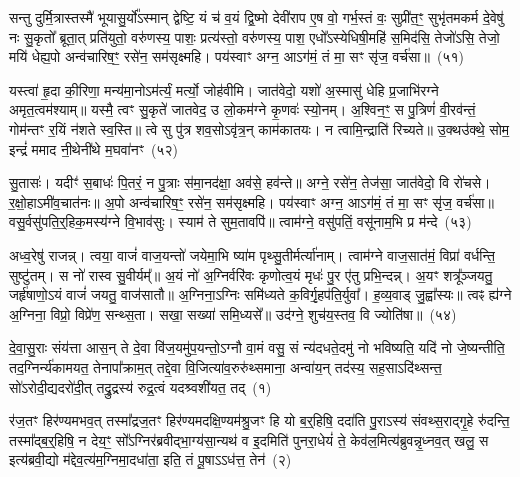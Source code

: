 सन्तु दुर्मि॒त्रास्तस्मै॑ भूयासु॒र्यो᳚\-ऽस्मान् द्वेष्टि॒ यं च॑ व॒यं द्वि॒ष्मो देवी॑राप ए॒ष वो॒ गर्भ॒स्तं वः॒ सुप्री॑त॒ꣳ॒ सुभृ॑तमकर्म दे॒वेषु॑ नः सु॒कृतो᳚ ब्रूता॒त् प्रति॑युतो॒ वरु॑णस्य॒ पाशः॒ प्रत्य॑स्तो॒ वरु॑णस्य॒ पाश॒ एधो᳚\-ऽस्येधिषी॒महि॑ स॒मिद॑सि॒ तेजो॑\-ऽसि॒ तेजो॒ मयि॑ धेह्य॒पो अन्व॑चारिष॒ꣳ॒ रसे॑न॒ सम॑सृक्ष्महि। पय॑स्वाꣳ अग्न॒ आ\-ऽग॑मं॒ तं मा॒ सꣳ सृ॑ज॒ वर्च॑सा॥~(५१)

{\anuvakamend[{दमे॑दम॒ ओष॑धय॒ आ षट् च॑}]}%

यस्त्वा॑ हृ॒दा की॒रिणा॒ मन्य॑मा॒नो\-ऽम॑र्त्यं॒ मर्त्यो॒ जोह॑वीमि। जात॑वेदो॒ यशो॑ अ॒स्मासु॑ धेहि प्र॒जाभि॑रग्ने अमृत॒त्वम॑श्याम्॥ यस्मै॒ त्वꣳ सु॒कृते॑ जातवेद॒ उ लो॒कम॑ग्ने कृ॒णवः॑ स्यो॒नम्। अ॒श्विन॒ꣳ॒ स पु॒त्रिणं॑ वी॒रव॑न्तं॒ गोम॑न्तꣳ र॒यिं न॑शते स्व॒स्ति॥ त्वे सु पु॑त्र शव॒सो\-ऽवृ॑त्र॒न् काम॑कातयः। न त्वामि॒न्द्राति॑ रिच्यते॥ उ॒क्थउ॑क्थे॒ सोम॒ इन्द्रं॑ ममाद नी॒थेनी॑थे म॒घवा॑नꣳ~(५२)

सु॒तासः॑। यदीꣳ॑ स॒बाधः॑ पि॒तरं॒ न पु॒त्राः स॑मा॒नद॑क्षा॒ अव॑से॒ हव॑न्ते॥ अग्ने॒ रसे॑न॒ तेज॑सा॒ जात॑वेदो॒ वि रो॑चसे। र॒क्षो॒हा\-ऽमी॑व॒चात॑नः॥ अ॒पो अन्व॑चारिष॒ꣳ॒ रसे॑न॒ सम॑सृक्ष्महि। पय॑स्वाꣳ अग्न॒ आ\-ऽग॑मं॒ तं मा॒ सꣳ सृ॑ज॒ वर्च॑सा॥ वसु॒र्वसु॑पति॒र्॒\mbox{}हिक॒मस्य॑ग्ने वि॒भाव॑सुः। स्याम॑ ते सुम॒तावपि॑॥ त्वाम॑ग्ने॒ वसु॑पतिं॒ वसू॑नाम॒भि प्र म॑न्दे~(५३)

अध्व॒रेषु॑ राजन्न्। त्वया॒ वाजं॑ वाज॒यन्तो॑ जयेमा॒भि ष्या॑म पृथ्सु॒तीर्मर्त्या॑नाम्। त्वाम॑ग्ने वाज॒सात॑मं॒ विप्रा॑ वर्धन्ति॒ सुष्टु॑तम्। स नो॑ रास्व सु॒वीर्यम्᳚॥ अ॒यं नो॑ अ॒ग्निर्वरि॑वः कृणोत्व॒यं मृधः॑ पु॒र ए॑तु प्रभि॒न्दन्न्। अ॒यꣳ शत्रू᳚ञ्जयतु॒ जर्\mbox{}हृ॑षाणो॒\-ऽयं वाजं॑ जयतु॒ वाज॑सातौ॥ अ॒ग्निना॒ऽग्निः समि॑ध्यते क॒विर्गृ॒हप॑ति॒र्युवा᳚। ह॒व्य॒वाड् जु॒ह्वा᳚स्यः॥ त्वꣴ ह्य॑ग्ने अ॒ग्निना॒ विप्रो॒ विप्रे॑ण॒ सन्थ्स॒ता। सखा॒ सख्या॑ समि॒ध्यसे᳚॥ उद॑ग्ने॒ शुच॑य॒स्तव॒ वि ज्योति॑षा॥~(५४)

{\anuvakamend[{म॒घवा॑नं मन्दे॒ ह्य॑ग्ने॒ चतु॑र्दश च}]}%

\setcounter{anuvakam}{0}
दे॒वा॒सु॒राः संय॑त्ता आस॒न् ते दे॒वा वि॑ज॒यमु॑प॒यन्तो॒\-ऽग्नौ वा॒मं वसु॒ सं न्य॑दधते॒दमु॑ नो भविष्यति॒ यदि॑ नो जे॒ष्यन्तीति॒ तद॒ग्निर्न्य॑कामयत॒ तेनापा᳚क्राम॒त् तद्दे॒वा वि॒जित्या॑व॒रुरु॑थ्समाना॒ अन्वा॑य॒न् तद॑स्य॒ सह॒सा\-ऽदि॑थ्सन्त॒ सो॑\-ऽरोदी॒द्यदरो॑दी॒त् तद्रु॒द्रस्य॑ रुद्र॒त्वं यदश्र्वशी॑यत॒ तद्~(१)

र॑ज॒तꣳ हिर॑ण्यमभव॒त् तस्मा᳚द्रज॒तꣳ हिर॑ण्यमदक्षि॒ण्य\-म॑श्रु॒जꣳ हि यो ब॒र्॒\mbox{}हिषि॒ ददा॑ति पु॒रा\-ऽस्य॑ संवथ्स॒राद्गृ॒हे रु॑दन्ति॒ तस्मा᳚द्ब॒र्॒\mbox{}हिषि॒ न देय॒ꣳ॒ सो᳚\-ऽग्निर॑ब्रवीद्भा॒ग्य॑सा॒न्यथ॑ व इ॒दमिति॑ पुनरा॒धेयं॑ ते॒ केव॑ल॒मित्य॑ब्रुवन्नृ॒ध्नव॒त् खलु॒ स इत्य॑ब्रवी॒द्यो म॑द्देव॒त्य॑म॒ग्निमा॒दधा॑ता॒ इति॒ तं पू॒षा\-ऽ\-ऽध॑त्त॒ तेन॑~(२)

